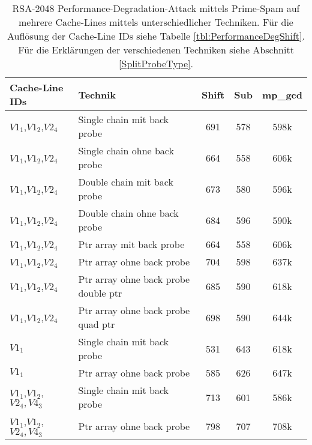 

\begin{table}[h]
\caption{RSA-2048 Performance-Degradation-Attack mittels Prime-Spam auf mehrere Cache-Lines mittels unterschiedlicher Techniken. Für die Auflösung der Cache-Line IDs siehe Tabelle \ref{tbl:PerformanceDegShift}. Für die Erklärungen der verschiedenen Techniken siehe Abschnitt \ref{SplitProbeType}.}
\label{tbl:PerformanceDegDifferentVariants}
\begin{tabular}{llccc}
\toprule
 Cache-Line IDs & Technik    & Shift & Sub & mp\_gcd \\
\midrule
$V1_1$,$V1_2$,$V2_4$ & Single chain mit back probe & 691   & 578  & 598k    \\
$V1_1$,$V1_2$,$V2_4$ & Single chain ohne back probe & 664   & 558 & 606k    \\
$V1_1$,$V1_2$,$V2_4$ & Double chain mit back probe & 673 & 580 & 596k    \\
$V1_1$,$V1_2$,$V2_4$ & Double chain ohne back probe & 684 & 596 & 590k    \\
$V1_1$,$V1_2$,$V2_4$ & Ptr array mit back probe & 664   & 558 & 606k    \\
$V1_1$,$V1_2$,$V2_4$ & Ptr array ohne back probe & 704   & 598 & 637k    \\
$V1_1$,$V1_2$,$V2_4$ & Ptr array ohne back probe double ptr & 685 & 590 & 618k    \\
$V1_1$,$V1_2$,$V2_4$ & Ptr array ohne back probe quad ptr & 698 & 590 & 644k    \\
\midrule
$V1_1$ & Single chain mit back probe & 531 & 643 & 618k    \\
$V1_1$ & Ptr array ohne back probe & 585 & 626 & 647k    \\
\midrule
$V1_1$,$V1_2$,$V2_4,V4_3$ & Single chain mit back probe & 713 & 601 & 586k    \\
$V1_1$,$V1_2$,$V2_4,V4_3$ & Ptr array ohne back probe & 798 & 707 & 708k    \\
\bottomrule
\end{tabular}
\end{table}






